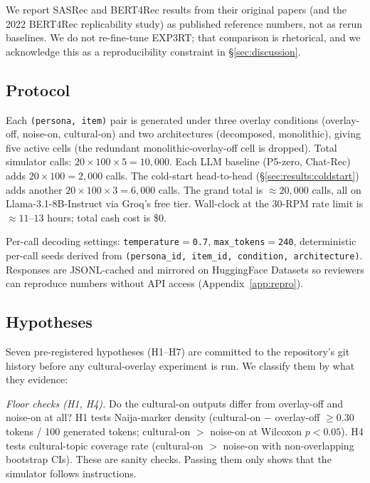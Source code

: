 \documentclass[8pt,twocolumn,a4paper]{extarticle}
\begin{document}
We report SASRec and BERT4Rec results from their original papers (and the 2022 BERT4Rec replicability study) as published reference numbers, not as rerun baselines. We do not re-fine-tune EXP3RT; that comparison is rhetorical, and we acknowledge this as a reproducibility constraint in \S\ref{sec:discussion}.

\subsection{Protocol}

Each \texttt{(persona, item)} pair is generated under three overlay conditions (overlay-off, noise-on, cultural-on) and two architectures (decomposed, monolithic), giving five active cells (the redundant monolithic-overlay-off cell is dropped). Total simulator calls: $20 \times 100 \times 5 = 10{,}000$. Each LLM baseline (P5-zero, Chat-Rec) adds $20 \times 100 = 2{,}000$ calls. The cold-start head-to-head (\S\ref{sec:results:coldstart}) adds another $20 \times 100 \times 3 = 6{,}000$ calls. The grand total is $\approx 20{,}000$ calls, all on Llama-3.1-8B-Instruct via Groq's free tier. Wall-clock at the 30-RPM rate limit is $\approx 11$--$13$ hours; total cash cost is \$0.

Per-call decoding settings: \texttt{temperature$=$0.7}, \texttt{max\_tokens$=$240}, deterministic per-call seeds derived from \texttt{(persona\_id, item\_id, condition, architecture)}. Responses are JSONL-cached and mirrored on HuggingFace Datasets so reviewers can reproduce numbers without API access (Appendix~\ref{app:repro}).

\subsection{Hypotheses}
\label{sec:exp:hypotheses}

Seven pre-registered hypotheses (H1--H7) are committed to the repository's git history before any cultural-overlay experiment is run. We classify them by what they evidence:

\textit{Floor checks (H1, H4).} Do the cultural-on outputs differ from overlay-off and noise-on at all? H1 tests Naija-marker density (cultural-on $-$ overlay-off $\geq 0.30$ tokens / 100 generated tokens; cultural-on $>$ noise-on at Wilcoxon $p < 0.05$). H4 tests cultural-topic coverage rate (cultural-on $>$ noise-on with non-overlapping bootstrap CIs). These are sanity checks. Passing them only shows that the simulator follows instructions.
\end{document}
